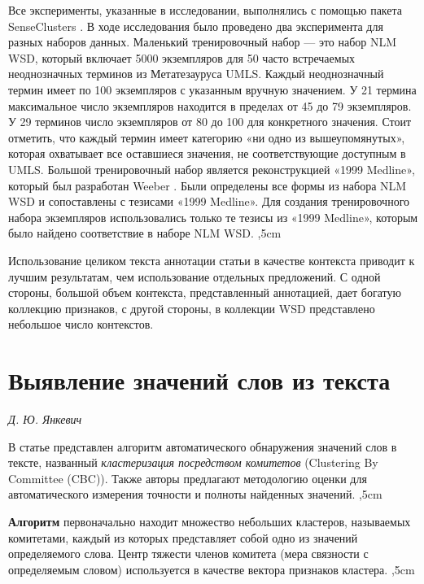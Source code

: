 \documentclass{article}
\begin{document}
\begin{articletext}
Все эксперименты, указанные в исследовании, выполнялись с помощью пакета SenseClusters \cite{SC:website}. В ходе исследования было проведено два эксперимента для разных наборов данных. Маленький тренировочный набор --- это набор NLM WSD, который включает 5000 экземпляров для 50 часто встречаемых неоднозначных терминов из Метатезауруса UMLS. Каждый неоднозначный термин имеет по 100 экземпляров с указанным вручную значением. У 21 термина максимальное число экземпляров находится в пределах от 45 до 79 экземпляров. У 29 терминов число экземпляров от 80 до 100 для  конкретного значения. Стоит отметить, что каждый термин имеет категорию «ни одно из вышеупомянутых», которая охватывает все оставшиеся значения, не соответствующие доступным в UMLS. Большой тренировочный набор является реконструкцией «1999 Medline», который был разработан Weeber \cite{Weeber 2001}. Были определены все формы из набора NLM WSD и сопоставлены с тезисами «1999 Medline». Для создания тренировочного набора экземпляров использовались только те тезисы из «1999 Medline», которым было найдено соответствие в наборе NLM WSD.
,5cm

Использование целиком текста аннотации статьи в качестве контекста приводит к лучшим результатам, чем использование отдельных предложений. С одной стороны, большой объем контекста, представленный аннотацией, дает богатую коллекцию признаков, с другой стороны, в коллекции WSD представлено небольшое число контекстов.

\section{Выявление значений слов из текста}
\begin{flushright}
\textit{Д. Ю. Янкевич} 
\end{flushright}

В статье \cite{Pantel 2002} представлен алгоритм автоматического обнаружения значений слов в тексте, названный \textit{кластеризация посредством комитетов} (Clustering By Committee (CBC)). Также авторы предлагают методологию оценки для автоматического измерения точности и полноты найденных значений.
,5cm

\textbf{Алгоритм} первоначально находит множество небольших кластеров, называемых комитетами, каждый из которых представляет собой одно из значений определяемого слова. Центр тяжести  членов комитета (мера связности с определяемым словом) используется в качестве вектора признаков кластера.
,5cm


\end{articletext}
\end{document}
